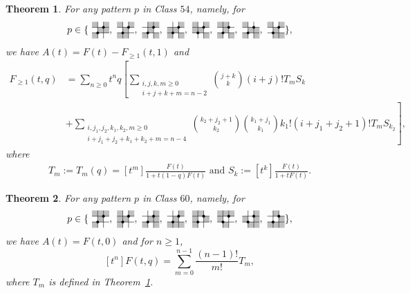 \documentclass[12pt]{article}
\newtheorem{thm}{Theorem}[section]
\newcommand{\pattern}[4]{										
	\raisebox{0.6ex}{
		\begin{tikzpicture}[scale=0.35, baseline=(current bounding box.center), #1]
		\foreach \x/\y in {#4}		\fill[gray!50] (\x,\y) rectangle +(1,1);

		\draw (0.01,0.01) grid (#2+0.99,#2+0.99);
		\foreach \x/\y in {#3}		\filldraw (\x,\y) circle (6pt);
		\end{tikzpicture}}
}
\begin{document}
\begin{thm}\label{thm:class54}
For any pattern $p$ in Class $54$, namely, for
$$
p\in \{\pattern{scale=0.6}{2}{1/1,2/2}{0/2,2/2,1/1,2/1,0/0}, 
            \pattern{scale=0.6}{2}{1/1,2/2}{0/2,2/2,1/1,0/0,1/0}, 
            \pattern{scale=0.6}{2}{1/1,2/2}{1/2,2/2,1/1,0/0,2/0}, 
            \pattern{scale=0.6}{2}{1/1,2/2}{2/2,0/1,1/1,0/0,2/0},
            \pattern{scale=0.6}{2}{1/1,2/2}{0/2,2/2,0/1,1/1,2/0}, 
            \pattern{scale=0.6}{2}{1/1,2/2}{0/2,1/2,1/1,0/0,2/0}, 
            \pattern{scale=0.6}{2}{1/1,2/2}{0/2,1/1,2/1,0/0,2/0}, 
            \pattern{scale=0.6}{2}{1/1,2/2}{0/2,2/2,1/1,1/0,2/0}\},$$
we have $A(t)=F(t)-F_{\geq 1}(t, 1)$ and
\begin{align}\label{class54-distr}
F_{\geq 1}(t,q) &= \sum_{n\geq 0}t^nq\left[\sum_{\substack{i, j, k, m\geq 0\\ i+j+k+m=n-2}} \binom{j+k}{k}(i+j)! T_m S_k\right.\nonumber\\
&\left.+\sum_{\substack{i, j_1, j_2, k_1, k_2, m\geq 0\\ i+j_1+j_2+k_1+k_2+m=n-4}}\binom{k_2+j_2+1}{k_2}\binom{k_1+j_1}{k_1}k_1!(i+j_1+j_2+1)! T_m S_{k_2}\right],
\end{align}
where
\begin{align*}
T_m:=T_m(q)=[t^m]\frac{F(t)}{1+t(1-q)F(t)}\text{ and }S_k:=[t^k]\frac{F(t)}{1+tF(t)}.
\end{align*}
\end{thm}

\begin{thm}\label{thm:class60}
For any pattern $p$ in Class $60$, namely, for
$$
p\in\{\pattern{scale=0.6}{2}{1/1,2/2}{0/2,1/2,2/2,1/1,0/0},\pattern{scale=0.6}{2}{1/1,2/2}{0/2,2/2,0/1,1/1,0/0},\pattern{scale=0.6}{2}{1/1,2/2}{2/2,1/1,2/1,0/0,2/0},\pattern{scale=0.6}{2}{1/1,2/2}{2/2,1/1,0/0,1/0,2/0},\pattern{scale=0.6}{2}{1/1,2/2}{0/2,1/2,0/1,2/1,0/0},\pattern{scale=0.6}{2}{1/1,2/2}{0/2,1/2,2/2,0/1,1/0},\pattern{scale=0.6}{2}{1/1,2/2}{2/2,0/1,2/1,1/0,2/0},\pattern{scale=0.6}{2}{1/1,2/2}{1/2,2/1,0/0,1/0,2/0}\},$$
we have $A(t)=F(t,0)$ and for $n\ge 1$,
\begin{equation}\label{class60-distr}
[t^n] F(t,q)=\sum_{m=0}^{n-1}\frac{(n-1)!}{m!}T_m,
\end{equation}
where $T_m$ is defined in Theorem~\ref{thm:class54}.
\end{thm}
\end{document}
